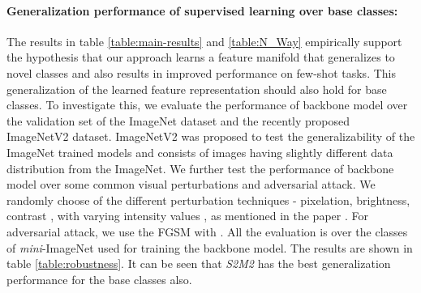\documentclass[10pt,twocolumn,letterpaper]{article}
\begin{document}
\begin{table}[t]
\centering
{}
\label{table:validation}
\end{table}
\paragraph{Generalization performance of supervised learning over base classes:}
The results in table \ref{table:main-results} and \ref{table:N_Way} empirically support the hypothesis that our approach learns a feature manifold that generalizes to novel classes and also results in improved performance on few-shot tasks. This generalization of the learned feature representation should also hold for base classes. To investigate this, we evaluate the performance of backbone model over the validation set of the ImageNet dataset and the recently proposed ImageNetV2 dataset\cite{recht2019imagenet}. ImageNetV2 was proposed to test the generalizability of the ImageNet trained models and consists of images having slightly different data distribution from the ImageNet. We further test the performance of backbone model over some common visual perturbations and adversarial attack. We randomly choose  of the  different perturbation techniques - pixelation, brightness, contrast , with  varying intensity values , as mentioned in the paper \cite{hendrycks2019robustness}. For adversarial attack, we use the FGSM \cite{goodfellow2014explaining} with . All the evaluation is over the  classes of \textit{mini}-ImageNet used for training the backbone model. The results are shown in table \ref{table:robustness}. It can be seen that \textit{S2M2} 
has the best generalization performance for the base classes also.
\end{document}
